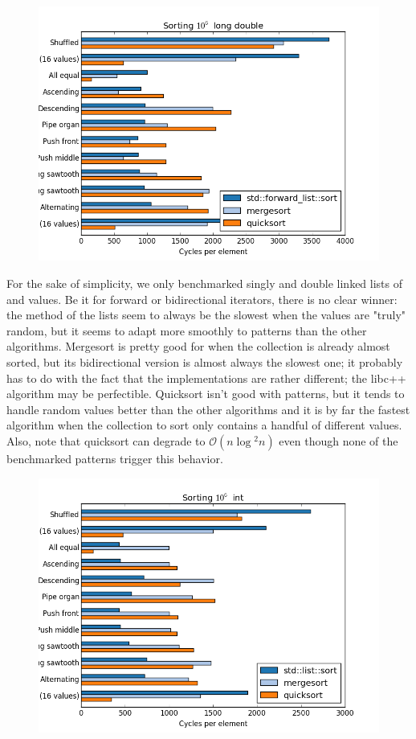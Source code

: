 \documentclass{isocpp_proposal}
\begin{document}
\begin{appendices}
\begin{figure}[h]
\includegraphics[width=\textwidth]{forward-list-long-double.png}
\end{figure}

For the sake of simplicity, we only benchmarked singly and double linked lists of  and  values. Be it for forward or bidirectional iterators, there is no clear winner: the  method of the lists seem to always be the slowest when the values are "truly" random, but it seems to adapt more smoothly to patterns than the other algorithms. Mergesort is pretty good for  when the collection is already almost sorted, but its bidirectional version is almost always the slowest one; it probably has to do with the fact that the implementations are rather different; the libc++ algorithm may be perfectible. Quicksort isn't good with patterns, but it tends to handle random values better than the other algorithms and it is by far the fastest algorithm when the collection to sort only contains a handful of different values. Also, note that quicksort can degrade to $\mathcal{O}(n \log{}^2 n)$ even though none of the benchmarked patterns trigger this behavior.

\begin{figure}[h]
\includegraphics[width=\textwidth]{list-int.png}
\end{figure}


\end{appendices}
\end{document}
